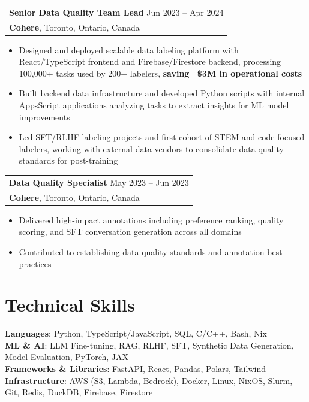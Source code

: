 \documentclass[letterpaper,10pt]{article}
\makeatletter
\newenvironment{resumeitemize}{
  \begin{itemize}[leftmargin=0.5in, itemsep=-1pt, topsep=1pt, labelsep=0.035in]
}{
  \end{itemize}
}
\newcommand{\experience}[4]{
  \begin{tabular}[t]{@{}p{6.5in}@{}}
    {\large\bfseries #1} \hfill {\small #2} \\
    {\bfseries #3}, #4
  \end{tabular}
}
\newcommand{\sectionspace}{\vspace{2pt}}
\makeatother
\begin{document}
\hspace{0.15in} \experience{Senior Data Quality Team Lead}{Jun 2023 -- Apr 2024}{Cohere}{Toronto, Ontario, Canada}
\begin{resumeitemize}
\item Designed and deployed scalable data labeling platform with React/TypeScript frontend and Firebase/Firestore backend, processing 100,000+ tasks used by 200+ labelers, \textbf{saving ~\$3M in operational costs}
\item Built backend data infrastructure and developed Python scripts with internal AppsScript applications analyzing tasks to extract insights for ML model improvements
\item Led SFT/RLHF labeling projects and first cohort of STEM and code-focused labelers, working with external data vendors to consolidate data quality standards for post-training
\end{resumeitemize}
\sectionspace

\hspace{0.15in} \experience{Data Quality Specialist}{May 2023 -- Jun 2023}{Cohere}{Toronto, Ontario, Canada}
\begin{resumeitemize}
\item Delivered high-impact annotations including preference ranking, quality scoring, and SFT conversation generation across all domains
\item Contributed to establishing data quality standards and annotation best practices
\end{resumeitemize}
\sectionspace



\section{Technical Skills}

\hspace{0.15in}\textbf{Languages}: Python, TypeScript/JavaScript, SQL, C/C++, Bash, Nix \\
\hspace{0.15in}\textbf{ML \& AI}: LLM Fine-tuning, RAG, RLHF, SFT, Synthetic Data Generation, Model Evaluation, PyTorch, JAX \\
\hspace{0.15in}\textbf{Frameworks \& Libraries}: FastAPI, React, Pandas, Polars, Tailwind \\
\hspace{0.15in}\textbf{Infrastructure}: AWS (S3, Lambda, Bedrock), Docker, Linux, NixOS, Slurm, Git, Redis, DuckDB, Firebase, Firestore
\sectionspace
\end{document}
